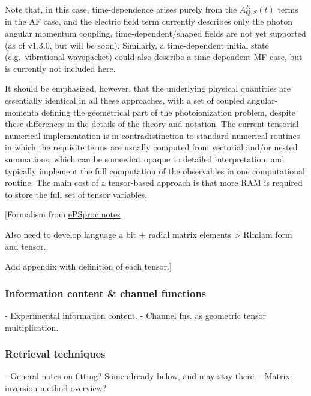Note that, in this case, time-dependence arises purely from the
\(A_{Q,S}^{K}(t)\) terms in the AF case, and the electric field term
currently describes only the photon angular momentum coupling,
time-dependent/shaped fields are not yet supported (as of v1.3.0, but
will be soon). Similarly, a time-dependent initial state
(e.g.~vibrational wavepacket) could also describe a time-dependent MF
case, but is currently not included here.

It should be emphasized, however, that the underlying physical quantities are essentially identical in all these approaches, with a set of coupled angular-momenta defining the geometrical part of the photoionization problem, despite these differences in the details of the theory and notation. The current tensorial numerical implementation is in contradistinction to standard numerical routines in which the requisite terms are usually computed from vectorial and/or nested summations, which can be somewhat opaque to detailed interpretation, and typically implement the full computation of the observables in one computational routine. The main cost of a tensor-based approach is that more RAM is required to store the full set of tensor variables.

[Formalism from 
\href{https://epsproc.readthedocs.io/en/dev/methods/ePSproc_geom_methods_summary_190821-v1-tidy.html}{ePSproc notes}


Also need to develop language a bit + radial matrix elements > Rlmlam form and tensor.

Add appendix with definition of each tensor.]


\subsubsection{Information content \& channel functions}

- Experimental information content.
- Channel fns. as geometric tensor multiplication.


\subsubsection{Retrieval techniques}

- General notes on fitting? Some already below, and may stay there.
- Matrix inversion method overview?
